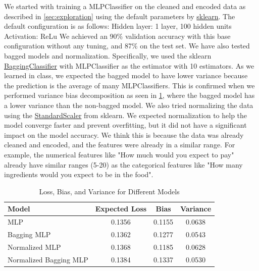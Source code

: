 \begin{itemize}
We started with training a MLPClassifier on the cleaned and encoded data as described in \ref{sec:exploration} using the default parameters by
\href{https://scikit-learn.org/stable/modules/generated/sklearn.neural_network.MLPClassifier.html}{sklearn}.
The default configuration is as follows:
Hidden layer: 1 layer, 100 hidden units
Activation: ReLu
We achieved an 90\% validation accuracy with this base configuration without any tuning, and 87\% on the test set.
We have also tested bagged models and normalization. Specifically, we used the sklearn \href{https://scikit-learn.org/stable/modules/generated/sklearn.ensemble.BaggingClassifier.html}{BaggingClassifier}
with MLPClassifier as the estimator with 10 estimators. As we learned in class, we expected the bagged model to have lower variance because the prediction is the average of many MLPClassifiers.
This is confirmed when we performed variance bias decomposition as seen in \ref{tab:nn_bias_var}, where the bagged model has a lower variance than the non-bagged model.
We also tried normalizing the data using the \href{https://scikit-learn.org/stable/modules/generated/sklearn.preprocessing.StandardScaler.html}{StandardScaler} from sklearn.
We expected normalization to help the model converge faster and prevent overfitting, but it did not have a significant impact on the model accuracy.
We think this is because the data was already cleaned and encoded, and the features were already in a similar range.
For example, the numerical features like "How much would you expect to pay" already have similar ranges (5-20) as the categorical features like "How many ingredients would you expect to be in the food".

\begin{table}[ht]
    \centering
    \begin{tabular}{lccc}
        \hline
        Model                  & Expected Loss & Bias   & Variance \\
        \hline
        MLP                    & 0.1356        & 0.1155 & 0.0638   \\
        Bagging MLP            & 0.1362        & 0.1277 & 0.0543   \\
        Normalized MLP         & 0.1368        & 0.1185 & 0.0628   \\
        Normalized Bagging MLP & 0.1384        & 0.1337 & 0.0530   \\
        \hline
    \end{tabular}
    \caption{Loss, Bias, and Variance for Different Models}
    \label{tab:nn_bias_var}
\end{table}


\end{itemize}
